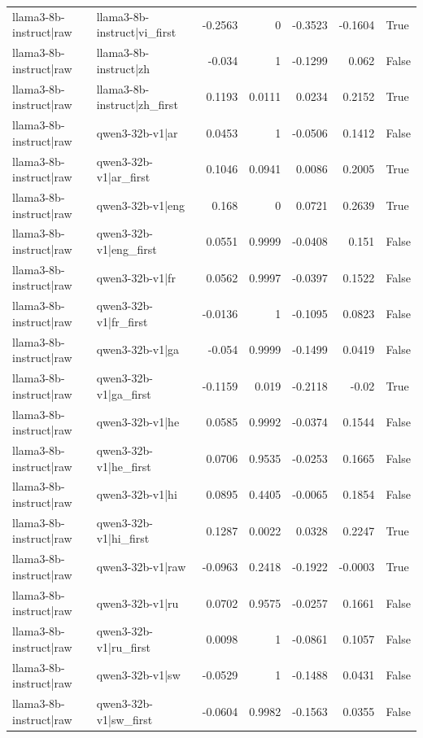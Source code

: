 \begin{table}
\begin{tabular}{l l r r r r l}
llama3-8b-instruct|raw & llama3-8b-instruct|vi_first & -0.2563 & 0 & -0.3523 & -0.1604 & True \\
llama3-8b-instruct|raw & llama3-8b-instruct|zh & -0.034 & 1 & -0.1299 & 0.062 & False \\
llama3-8b-instruct|raw & llama3-8b-instruct|zh_first & 0.1193 & 0.0111 & 0.0234 & 0.2152 & True \\
llama3-8b-instruct|raw & qwen3-32b-v1|ar & 0.0453 & 1 & -0.0506 & 0.1412 & False \\
llama3-8b-instruct|raw & qwen3-32b-v1|ar_first & 0.1046 & 0.0941 & 0.0086 & 0.2005 & True \\
llama3-8b-instruct|raw & qwen3-32b-v1|eng & 0.168 & 0 & 0.0721 & 0.2639 & True \\
llama3-8b-instruct|raw & qwen3-32b-v1|eng_first & 0.0551 & 0.9999 & -0.0408 & 0.151 & False \\
llama3-8b-instruct|raw & qwen3-32b-v1|fr & 0.0562 & 0.9997 & -0.0397 & 0.1522 & False \\
llama3-8b-instruct|raw & qwen3-32b-v1|fr_first & -0.0136 & 1 & -0.1095 & 0.0823 & False \\
llama3-8b-instruct|raw & qwen3-32b-v1|ga & -0.054 & 0.9999 & -0.1499 & 0.0419 & False \\
llama3-8b-instruct|raw & qwen3-32b-v1|ga_first & -0.1159 & 0.019 & -0.2118 & -0.02 & True \\
llama3-8b-instruct|raw & qwen3-32b-v1|he & 0.0585 & 0.9992 & -0.0374 & 0.1544 & False \\
llama3-8b-instruct|raw & qwen3-32b-v1|he_first & 0.0706 & 0.9535 & -0.0253 & 0.1665 & False \\
llama3-8b-instruct|raw & qwen3-32b-v1|hi & 0.0895 & 0.4405 & -0.0065 & 0.1854 & False \\
llama3-8b-instruct|raw & qwen3-32b-v1|hi_first & 0.1287 & 0.0022 & 0.0328 & 0.2247 & True \\
llama3-8b-instruct|raw & qwen3-32b-v1|raw & -0.0963 & 0.2418 & -0.1922 & -0.0003 & True \\
llama3-8b-instruct|raw & qwen3-32b-v1|ru & 0.0702 & 0.9575 & -0.0257 & 0.1661 & False \\
llama3-8b-instruct|raw & qwen3-32b-v1|ru_first & 0.0098 & 1 & -0.0861 & 0.1057 & False \\
llama3-8b-instruct|raw & qwen3-32b-v1|sw & -0.0529 & 1 & -0.1488 & 0.0431 & False \\
llama3-8b-instruct|raw & qwen3-32b-v1|sw_first & -0.0604 & 0.9982 & -0.1563 & 0.0355 & False \\

\end{tabular}
\end{table}
